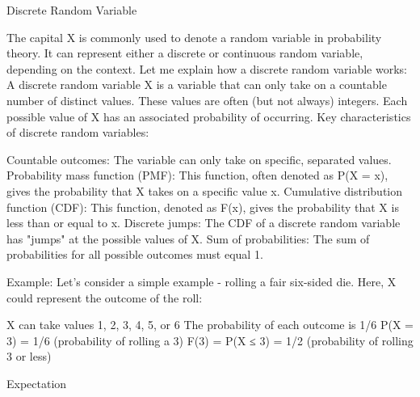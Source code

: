 Discrete Random Variable

The capital X is commonly used to denote a random variable in probability theory. It can represent either a discrete or continuous random variable, depending on the context.
Let me explain how a discrete random variable works:
A discrete random variable X is a variable that can only take on a countable number of distinct values. These values are often (but not always) integers. Each possible value of X has an associated probability of occurring.
Key characteristics of discrete random variables:

Countable outcomes: The variable can only take on specific, separated values.
Probability mass function (PMF): This function, often denoted as P(X = x), gives the probability that X takes on a specific value x.
Cumulative distribution function (CDF): This function, denoted as F(x), gives the probability that X is less than or equal to x.
Discrete jumps: The CDF of a discrete random variable has "jumps" at the possible values of X.
Sum of probabilities: The sum of probabilities for all possible outcomes must equal 1.

Example:
Let's consider a simple example - rolling a fair six-sided die. Here, X could represent the outcome of the roll:

X can take values 1, 2, 3, 4, 5, or 6
The probability of each outcome is 1/6
P(X = 3) = 1/6 (probability of rolling a 3)
F(3) = P(X ≤ 3) = 1/2 (probability of rolling 3 or less)

Expectation
